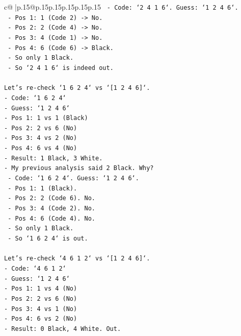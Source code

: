 \documentclass{article}
\begin{document}
{\begin{supertabular}{c@{$\;$}|p{.15\linewidth}@{}p{.15\linewidth}p{.15\linewidth}p{.15\linewidth}p{.15\linewidth}p{.15\linewidth}}
{{{\texttt{  {-} Code: `2 4 1 6`. Guess: `1 2 4 6`.} \\
\texttt{  {-} Pos 1: 1 (Code 2) {-}> No.} \\
\texttt{  {-} Pos 2: 2 (Code 4) {-}> No.} \\
\texttt{  {-} Pos 3: 4 (Code 1) {-}> No.} \\
\texttt{  {-} Pos 4: 6 (Code 6) {-}> Black.} \\
\texttt{  {-} So only 1 Black.} \\
\texttt{  {-} So `2 4 1 6` is indeed out.} \\
\\ 
\texttt{Let's re{-}check `1 6 2 4` vs `{[}1 2 4 6{]}`.} \\
\texttt{{-} Code: `1 6 2 4`} \\
\texttt{{-} Guess: `1 2 4 6`} \\
\texttt{{-} Pos 1: 1 vs 1 (Black)} \\
\texttt{{-} Pos 2: 2 vs 6 (No)} \\
\texttt{{-} Pos 3: 4 vs 2 (No)} \\
\texttt{{-} Pos 4: 6 vs 4 (No)} \\
\texttt{{-} Result: 1 Black, 3 White.} \\
\texttt{{-} My previous analysis said 2 Black. Why?} \\
\texttt{  {-} Code: `1 6 2 4`. Guess: `1 2 4 6`.} \\
\texttt{  {-} Pos 1: 1 (Black).} \\
\texttt{  {-} Pos 2: 2 (Code 6). No.} \\
\texttt{  {-} Pos 3: 4 (Code 2). No.} \\
\texttt{  {-} Pos 4: 6 (Code 4). No.} \\
\texttt{  {-} So only 1 Black.} \\
\texttt{  {-} So `1 6 2 4` is out.} \\
\\ 
\texttt{Let's re{-}check `4 6 1 2` vs `{[}1 2 4 6{]}`.} \\
\texttt{{-} Code: `4 6 1 2`} \\
\texttt{{-} Guess: `1 2 4 6`} \\
\texttt{{-} Pos 1: 1 vs 4 (No)} \\
\texttt{{-} Pos 2: 2 vs 6 (No)} \\
\texttt{{-} Pos 3: 4 vs 1 (No)} \\
\texttt{{-} Pos 4: 6 vs 2 (No)} \\
\texttt{{-} Result: 0 Black, 4 White. Out.} \\
}}}
\end{supertabular}}
\end{document}
